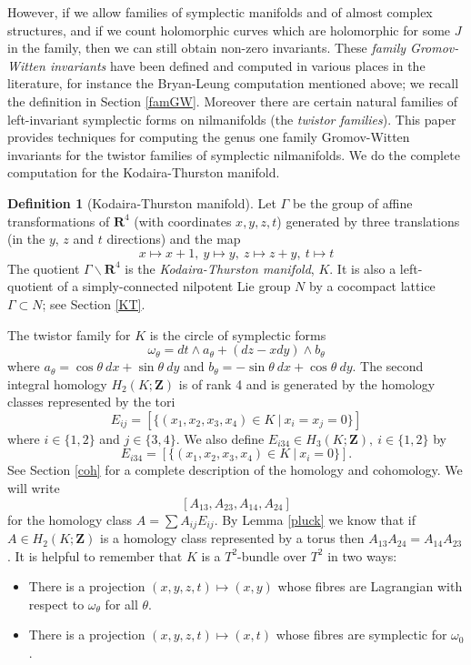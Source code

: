 \documentclass[11pt]{amsart}
\newcommand{\RR}{\mathbf{R}}
\newcommand{\ZZ}{\mathbf{Z}}
\numberwithin{equation}{section}
\theoremstyle{definition}
\newtheorem{dfn}[equation]{Definition}
\theoremstyle{remark}
\begin{document}
However, if we allow families of symplectic manifolds and of almost complex structures, and if we count holomorphic curves which are holomorphic for some $J$ in the family, then we can still obtain non-zero invariants. These {\em family Gromov-Witten invariants} have been defined and computed in various places in the literature, for instance the Bryan-Leung computation mentioned above; we recall the definition in Section \ref{famGW}. Moreover there are certain natural families of left-invariant symplectic forms on nilmanifolds (the {\em twistor families}). This paper provides techniques for computing the genus one family Gromov-Witten invariants for the twistor families of symplectic nilmanifolds. We do the complete computation for the Kodaira-Thurston manifold.

\begin{dfn}[Kodaira-Thurston manifold]
Let $\Gamma$ be the group of affine transformations of $\RR^4$ (with coordinates $x,y,z,t$) generated by three translations (in the $y$, $z$ and $t$ directions) and the map
\[x\mapsto x+1,\ y\mapsto y,\ z\mapsto z+y,\ t\mapsto t\]
The quotient $\Gamma\backslash\RR^4$ is the {\em Kodaira-Thurston manifold}, $K$. It is also a left-quotient of a simply-connected nilpotent Lie group $N$ by a cocompact lattice $\Gamma\subset N$; see Section \ref{KT}.
\end{dfn}
The twistor family for $K$ is the circle of symplectic forms
\[\omega_{\theta}=dt\wedge a_{\theta}+(dz-xdy)\wedge b_{\theta}\]
where $a_{\theta}=\cos\theta\ dx+\sin\theta\ dy$ and $b_{\theta}=-\sin\theta\ dx+\cos\theta\ dy$. The second integral homology $H_2(K;\ZZ)$ is of rank 4 and is generated by the homology classes represented by the tori
\[E_{ij}=[\{(x_1,x_2,x_3,x_4)\in K\ |\ x_i=x_j=0\}]\]
where $i\in\{1,2\}$ and $j\in\{3,4\}$. We also define $E_{i34}\in H_3(K;\ZZ),\ i\in\{1,2\}$ by
\[E_{i34}=[\{(x_1,x_2,x_3,x_4)\in K\ |\ x_i=0\}].\]
See Section \ref{coh} for a complete description of the homology and cohomology. We will write
\[[A_{13},A_{23},A_{14},A_{24}]\]
for the homology class $A=\sum A_{ij}E_{ij}$. By Lemma \ref{pluck} we know that if $A\in H_2(K;\ZZ)$ is a homology class represented by a torus then $A_{13}A_{24}=A_{14}A_{23}$. It is helpful to remember that $K$ is a $T^2$-bundle over $T^2$ in two ways:
\begin{itemize}
\item There is a projection $(x,y,z,t)\mapsto (x,y)$ whose fibres are Lagrangian with respect to $\omega_{\theta}$ for all $\theta$.
\item There is a projection $(x,y,z,t)\mapsto (x,t)$ whose fibres are symplectic for $\omega_0$.
\end{itemize}
\end{document}
